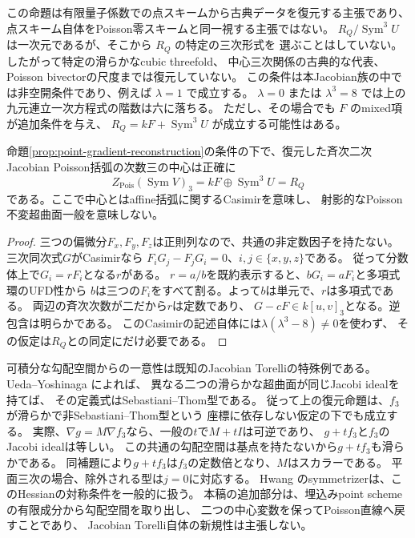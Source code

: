 \begin{remark}[復元の範囲]
この命題は有限量子係数での点スキームから古典データを復元する主張であり、
点スキーム自体をPoisson零スキームと同一視する主張ではない。
$R_Q/\operatorname{Sym}^3U$ は一次元であるが、そこから $R_Q$ の特定の三次形式を
選ぶことはしていない。したがって特定の滑らかなcubic threefold、
中心三次関係の古典的な代表、Poisson bivectorの尺度までは復元していない。
この条件は本Jacobian族の中では非空開条件であり、例えば $\lambda=1$ で成立する。
$\lambda=0$ または $\lambda^3=8$ では上の九元連立一次方程式の階数は六に落ちる。
ただし、その場合でも $F$ のmixed項が追加条件を与え、
$R_Q=kF+\operatorname{Sym}^3U$ が成立する可能性はある。
\end{remark}


\begin{corollary}[三次Casimir全体の内在的な復元]
\label{cor:point-full-casimir-space}
命題\ref{prop:point-gradient-reconstruction}の条件の下で、復元した斉次二次
Jacobian Poisson括弧の次数三の中心は正確に
\[
 Z_{\mathrm{Pois}}(\operatorname{Sym}V)_3
 =kF\oplus\operatorname{Sym}^3U=R_Q
\]
である。ここで中心とはaffine括弧に関するCasimirを意味し、
射影的なPoisson不変超曲面一般を意味しない。
\end{corollary}
\begin{proof}
三つの偏微分$F_x,F_y,F_z$は正則列なので、共通の非定数因子を持たない。
三次同次式$G$がCasimirなら
$F_iG_j-F_jG_i=0$、$i,j\in\{x,y,z\}$である。
従って分数体上で$G_i=rF_i$となる$r$がある。
$r=a/b$を既約表示すると、$bG_i=aF_i$と多項式環のUFD性から
$b$は三つの$F_i$をすべて割る。よって$b$は単元で、$r$は多項式である。
両辺の斉次次数が二だから$r$は定数であり、
$G-cF\in k[u,v]_3$となる。逆包含は明らかである。
このCasimirの記述自体には$\lambda(\lambda^3-8)\ne0$を使わず、
その仮定は$R_Q$との同定にだけ必要である。
\end{proof}

\begin{remark}
\label{rem:point-jacobian-torelli}
可積分な勾配空間からの一意性は既知のJacobian Torelliの特殊例である。
Ueda--Yoshinaga \cite[\S3, Lemma~3]{UedaYoshinagaJacobian}によれば、
異なる二つの滑らかな超曲面が同じJacobi idealを持てば、
その定義式はSebastiani--Thom型である。
従って上の復元命題は、$f_3$が滑らかで非Sebastiani--Thom型という
座標に依存しない仮定の下でも成立する。
実際、$\nabla g=M\nabla f_3$なら、一般の$t$で$M+tI$は可逆であり、
$g+tf_3$と$f_3$のJacobi idealは等しい。
この共通の勾配空間は基点を持たないから$g+tf_3$も滑らかである。
同補題により$g+tf_3$は$f_3$の定数倍となり、$M$はスカラーである。
平面三次の場合、除外される型は$j=0$に対応する。
Hwang \cite[Definition~2.1 and Theorems~1.3, 1.5--1.6]{HwangSymmetrizer}
のsymmetrizerは、このHessianの対称条件を一般的に扱う。
本稿の追加部分は、埋込みpoint schemeの有限成分から勾配空間を取り出し、
二つの中心変数を保ってPoisson直線へ戻すことであり、
Jacobian Torelli自体の新規性は主張しない。
\end{remark}

